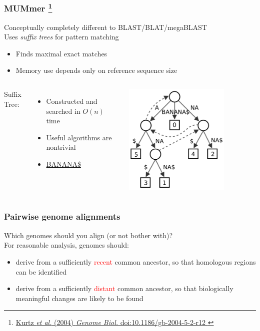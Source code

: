 %
\begin{frame}
  \frametitle{MUMmer
  \footnote{\tiny{\href{http://dx.doi.org/10.1186/gb-2004-5-2-r12
}{Kurtz \textit{et al.} (2004) \textit{Genome Biol.} doi:10.1186/gb-2004-5-2-r12
}}}
  }
  Conceptually completely different to BLAST/BLAT/megaBLAST \\
  \textcolor{RawSienna}{Uses \textit{suffix trees} for pattern matching}
  \begin{itemize}
    \item \textcolor{hutton_green}{Finds maximal exact matches}
    \item \textcolor{hutton_blue}{Memory use depends only on reference sequence size}
  \end{itemize}
  \begin{columns}[T] 
      \textcolor{hutton_purple}{Suffix Tree:}
      \begin{itemize}
        \item Constructed and searched in $O(n)$ time
        \item Useful algorithms are nontrivial
        \item \url{BANANA$}
      \end{itemize}
      \includegraphics[width=0.75\textwidth]{images/suffix_tree}
  \end{columns}    
\end{frame}

%
\begin{frame}
  \frametitle{Pairwise genome alignments}
  \textcolor{hutton_green}{Which genomes should you align (or not bother with)?} \\
  \textcolor{RawSienna}{For reasonable analysis, genomes should}:
  \begin{itemize}
    \item derive from a sufficiently \textcolor{red}{recent} common ancestor, so that \textcolor{hutton_purple}{homologous regions can be identified}
    \item derive from a sufficiently \textcolor{red}{distant} common ancestor, so that \textcolor{hutton_purple}{biologically meaningful changes are likely to be found}
  \end{itemize}
\end{frame}

